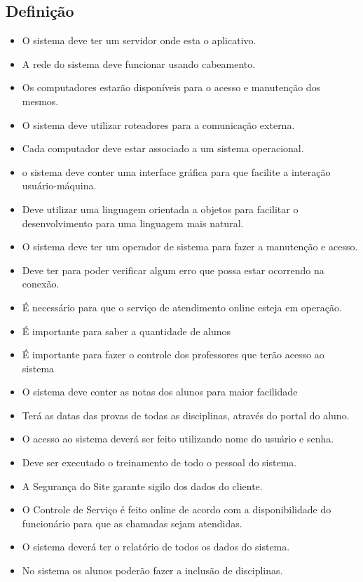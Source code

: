   \subsection{Definição}
  \begin{itemize}
\item O sistema deve ter um servidor onde esta o aplicativo.
\item A rede do sistema deve  funcionar usando cabeamento.
\item Os computadores estarão disponíveis para o acesso e manutenção dos mesmos.
\item O sistema deve utilizar roteadores para a comunicação externa.
\item Cada computador deve estar associado a um sistema operacional.
\item o sistema deve conter uma interface gráfica para que facilite a interação usuário-máquina.
\item Deve utilizar uma linguagem orientada a objetos para facilitar o desenvolvimento para uma linguagem mais natural.
\item O sistema deve ter um operador de sistema para fazer a manutenção e acesso.
\item Deve ter para poder verificar algum erro que possa estar ocorrendo na conexão.
\item É necessário para que o serviço de atendimento online esteja em operação.
\item É importante para saber a quantidade de alunos
\item É importante para fazer o controle dos professores que terão acesso ao sistema
\item O sistema deve conter as notas dos alunos para maior facilidade
\item Terá as datas das provas de todas as disciplinas, através do portal do aluno.
\item O acesso ao sistema deverá ser feito utilizando nome do usuário e senha.
\item Deve ser executado o treinamento de todo o pessoal do sistema.
\item A Segurança do Site garante sigilo dos dados do cliente.
\item O Controle de Serviço é feito online de acordo com a disponibilidade do funcionário para que as chamadas sejam atendidas.
\item O sistema deverá ter o relatório de todos os dados do sistema.
\item No sistema os alunos poderão fazer a inclusão de disciplinas.

\end{itemize}
